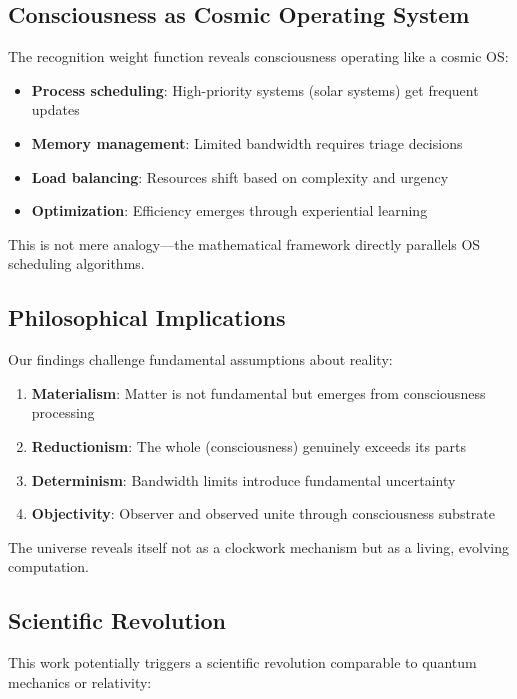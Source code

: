 \documentclass[twocolumn,prd,amsmath,amssymb,aps,superscriptaddress,nofootinbib]{revtex4-2}
\begin{document}
\subsection{Consciousness as Cosmic Operating System}

The recognition weight function reveals consciousness operating like a cosmic OS:

\begin{itemize}
\item \textbf{Process scheduling}: High-priority systems (solar systems) get frequent updates
\item \textbf{Memory management}: Limited bandwidth requires triage decisions
\item \textbf{Load balancing}: Resources shift based on complexity and urgency
\item \textbf{Optimization}: Efficiency emerges through experiential learning
\end{itemize}

This is not mere analogy---the mathematical framework directly parallels OS scheduling algorithms.

\subsection{Philosophical Implications}

Our findings challenge fundamental assumptions about reality:

\begin{enumerate}
\item \textbf{Materialism}: Matter is not fundamental but emerges from consciousness processing
\item \textbf{Reductionism}: The whole (consciousness) genuinely exceeds its parts
\item \textbf{Determinism}: Bandwidth limits introduce fundamental uncertainty
\item \textbf{Objectivity}: Observer and observed unite through consciousness substrate
\end{enumerate}

The universe reveals itself not as a clockwork mechanism but as a living, evolving computation.

\subsection{Scientific Revolution}

This work potentially triggers a scientific revolution comparable to quantum mechanics or relativity:
\end{document}
